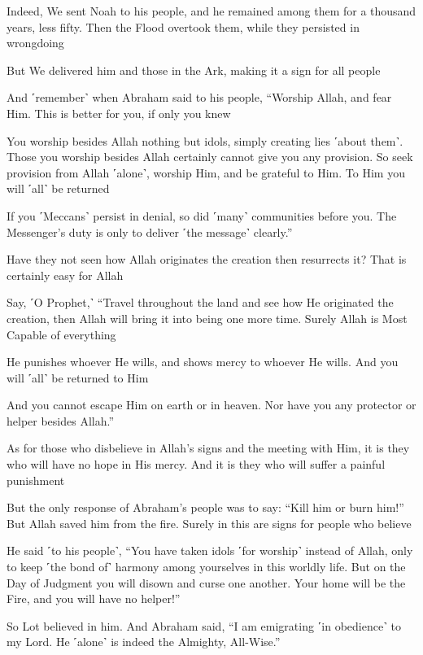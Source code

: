 Indeed, We sent Noah to his people, and he remained among them for a thousand years, less fifty. Then the Flood overtook them, while they persisted in wrongdoing

But We delivered him and those in the Ark, making it a sign for all people

And ˹remember˺ when Abraham said to his people, “Worship Allah, and fear Him. This is better for you, if only you knew

You worship besides Allah nothing but idols, simply creating lies ˹about them˺. Those you worship besides Allah certainly cannot give you any provision. So seek provision from Allah ˹alone˺, worship Him, and be grateful to Him. To Him you will ˹all˺ be returned

If you ˹Meccans˺ persist in denial, so did ˹many˺ communities before you. The Messenger’s duty is only to deliver ˹the message˺ clearly.”

Have they not seen how Allah originates the creation then resurrects it? That is certainly easy for Allah

Say, ˹O Prophet,˺ “Travel throughout the land and see how He originated the creation, then Allah will bring it into being one more time. Surely Allah is Most Capable of everything

He punishes whoever He wills, and shows mercy to whoever He wills. And you will ˹all˺ be returned to Him

And you cannot escape Him on earth or in heaven. Nor have you any protector or helper besides Allah.”

As for those who disbelieve in Allah’s signs and the meeting with Him, it is they who will have no hope in His mercy. And it is they who will suffer a painful punishment

But the only response of Abraham’s people was to say: “Kill him or burn him!” But Allah saved him from the fire. Surely in this are signs for people who believe

He said ˹to his people˺, “You have taken idols ˹for worship˺ instead of Allah, only to keep ˹the bond of˺ harmony among yourselves in this worldly life. But on the Day of Judgment you will disown and curse one another. Your home will be the Fire, and you will have no helper!”

So Lot believed in him. And Abraham said, “I am emigrating ˹in obedience˺ to my Lord. He ˹alone˺ is indeed the Almighty, All-Wise.”

